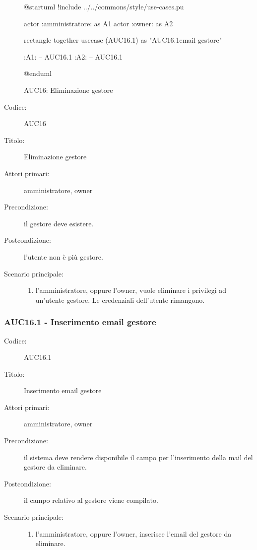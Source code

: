 \documentclass[../../../analisi-dei-requisiti.tex]{subfiles}
\begin{document}
\begin{figure}[H]
  \centering
  \begin{plantuml}
  @startuml
  !include ../../commons/style/use-cases.pu

  actor :amministratore: as A1
  actor :owner: as A2


  rectangle {
    together {
      usecase (AUC16.1) as "AUC16.1\nInserimento email gestore"
    }
  }

  :A1: -- AUC16.1
  :A2: -- AUC16.1

  @enduml
  \end{plantuml}
  \caption{AUC16: Eliminazione gestore}
  \label{fig:auc16}
\end{figure}

\begin{description}
  \item[Codice:] AUC16
  \item[Titolo:] Eliminazione gestore
  \item[Attori primari:] amministratore, owner
  \item[Precondizione:] il gestore deve esistere.
  \item[Postcondizione:] l'utente non è più gestore.
  \item[Scenario principale:]
  \begin{enumerate}
    \item l'amministratore, oppure l'owner, vuole eliminare i privilegi ad un'utente gestore. Le credenziali dell'utente rimangono.
  \end{enumerate}
\end{description}

\subsubsection{AUC16.1 - Inserimento email gestore}%
\label{subs:AUC16.1}
\begin{description}
  \item[Codice:] AUC16.1
  \item[Titolo:] Inserimento email gestore
  \item[Attori primari:] amministratore, owner
  \item[Precondizione:] il sistema deve rendere disponibile il campo per l'inserimento della mail del gestore da eliminare.
  \item[Postcondizione:] il campo relativo al gestore viene compilato.
  \item[Scenario principale:]
  \begin{enumerate}
    \item l'amministratore, oppure l'owner, inserisce l'email del gestore da eliminare.
  \end{enumerate}
\end{description}
\end{document}
